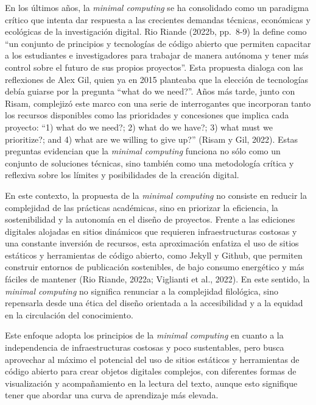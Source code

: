 \documentclass[
  letterpaper,
  DIV=11,
  numbers=noendperiod]{scrreprt}
\begin{document}
En los últimos años, la \emph{minimal computing} se ha consolidado como
un paradigma crítico que intenta dar respuesta a las crecientes demandas
técnicas, económicas y ecológicas de la investigación digital. Rio
Riande (2022b, pp.~8-9) la define como ``un conjunto de principios y
tecnologías de código abierto que permiten capacitar a los estudiantes e
investigadores para trabajar de manera autónoma y tener más control
sobre el futuro de sus propios proyectos''. Esta propuesta dialoga con
las reflexiones de Alex Gil, quien ya en 2015 planteaba que la elección
de tecnologías debía guiarse por la pregunta ``what do we need?''. Años
más tarde, junto con Risam, complejizó este marco con una serie de
interrogantes que incorporan tanto los recursos disponibles como las
prioridades y concesiones que implica cada proyecto: ``1) what do we
need?; 2) what do we have?; 3) what must we prioritize?; and 4) what are
we willing to give up?'' (Risam y Gil, 2022). Estas preguntas evidencian
que la \emph{minimal computing} funciona no sólo como un conjunto de
soluciones técnicas, sino también como una metodología crítica y
reflexiva sobre los límites y posibilidades de la creación digital.

En este contexto, la propuesta de la \emph{minimal computing} no
consiste en reducir la complejidad de las prácticas académicas, sino en
priorizar la eficiencia, la sostenibilidad y la autonomía en el diseño
de proyectos. Frente a las ediciones digitales alojadas en sitios
dinámicos que requieren infraestructuras costosas y una constante
inversión de recursos, esta aproximación enfatiza el uso de sitios
estáticos y herramientas de código abierto, como Jekyll y Github, que
permiten construir entornos de publicación sostenibles, de bajo consumo
energético y más fáciles de mantener (Rio Riande, 2022a; Viglianti et
al., 2022). En este sentido, la \emph{minimal computing} no significa
renunciar a la complejidad filológica, sino repensarla desde una ética
del diseño orientada a la accesibilidad y a la equidad en la circulación
del conocimiento.

Este enfoque adopta los principios de la \emph{minimal computing} en
cuanto a la independencia de infraestructuras costosas y poco
sustentables, pero busca aprovechar al máximo el potencial del uso de
sitios estáticos y herramientas de código abierto para crear objetos
digitales complejos, con diferentes formas de visualización y
acompañamiento en la lectura del texto, aunque esto signifique tener que
abordar una curva de aprendizaje más elevada.
\end{document}
